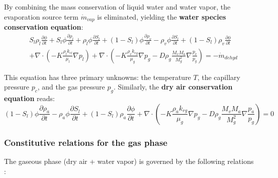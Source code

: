 By combining the mass conservation of liquid water and water vapor, the evaporation source term $\dot{m}_{vap}$ is eliminated, yielding the \textbf{water species conservation equation}:
\begin{equation}
\begin{split}
&S_l \rho_l \frac{\partial \phi}{\partial t} + S_l \phi \frac{\partial \rho_l}{\partial t} + \rho_l \phi \frac{\partial S_l}{\partial t} + (1-S_l)\phi\frac{\partial \rho_v}{\partial t} - \rho_v \phi \frac{\partial S_l}{\partial t} + (1-S_l)\rho_v \frac{\partial \phi}{\partial t} \\&+ \nabla\cdot\left(-K\frac{\rho_l k_{rl}}{\mu_l}\nabla p_l\right) + \nabla\cdot\left(-K\frac{\rho_v k_{rg}}{\mu_g}\nabla p_g - D\rho_g \frac{M_v M_a}{M_g^2}\nabla\frac{p_v}{p_g} \right) = -\dot{m}_{dehyd}
\end{split}
\label{eq:water_species}
\end{equation}

This equation has three primary unknowns: the temperature $T$, the capillary pressure $p_c$, and the gas pressure $p_g$. 
Similarly, the \textbf{dry air conservation equation} reads:
\begin{equation}
(1-S_l)\phi\frac{\partial \rho_a}{\partial t} - \rho_a \phi \frac{\partial S_l}{\partial t} + (1-S_l)\rho_a \frac{\partial \phi}{\partial t} + \nabla\cdot\left(-K\frac{\rho_a k_{rg}}{\mu_g}\nabla p_g - D\rho_g \frac{M_v M_a}{M_g^2}\nabla\frac{p_a}{p_g} \right) = 0
\label{eq:dry_air}
\end{equation}

\subsubsection{Constitutive relations for the gas phase}

The gaseous phase (dry air + water vapor) is governed by the following relations \cite{dauti2018}:

